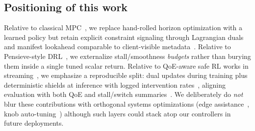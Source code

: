 \documentclass[preprint,12pt]{elsarticle}
\begin{document}
\subsection{Positioning of this work}

Relative to classical MPC~\cite{yin2015control}, we replace hand-rolled horizon optimization with a learned policy but retain explicit constraint signaling through Lagrangian duals~\cite{paternain2019dual} and manifest lookahead comparable to client-visible metadata~\cite{sodagar2011mpeg}.
Relative to Pensieve-style DRL~\cite{mao2017neural,gadaleta2017ddash}, we externalize stall/smoothness \emph{budgets} rather than burying them inside a single tuned scalar return.
Relative to QoE-aware safe RL works in streaming~\cite{xiao2025qoe}, we emphasize a reproducible split: dual updates during training plus deterministic shields at inference with logged intervention rates~\cite{alshiekh2018shielding}, aligning evaluation with both QoE and stall/switch summaries~\cite{wu2024qoe}.
We deliberately do \emph{not} blur these contributions with orthogonal systems optimizations (edge assistance~\cite{kang2023adaptive,kim2023http}, knob auto-tuning~\cite{akhtar2018oboe}) although such layers could stack atop our controllers in future deployments.
\end{document}
